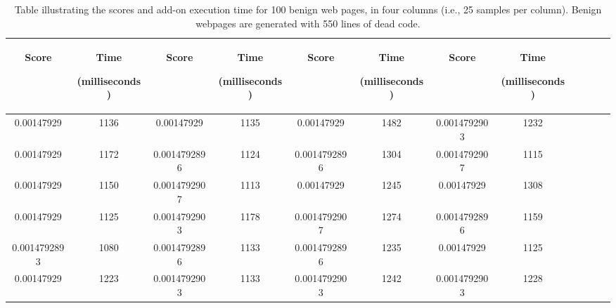   \begin {table}[h]
  \caption[Scores table of benign web pages]{Table illustrating the scores and add-on execution time for 100 benign web pages, in four columns (i.e., 25 samples per column). Benign webpages are generated with 550 lines of dead code.}
      \label{tab:b500table} 
  \begin{tabular}{|c|c|c|c|c|c|c|c|c|c|c|c|} 
  \midrule
 \begin{sideways}Score\end{sideways}& \begin{sideways}Time\end{sideways} \begin{sideways} (milliseconds)\end{sideways}& \begin{sideways}Score\end{sideways}& \begin{sideways}Time\end{sideways}  \begin{sideways}(milliseconds)\end{sideways}& \begin{sideways}Score\end{sideways}& \begin{sideways}Time\end{sideways}  \begin{sideways}(milliseconds)\end{sideways}& \begin{sideways}Score\end{sideways}& \begin{sideways}Time\end{sideways}  \begin{sideways} (milliseconds)\end{sideways}\\
\midrule
0.00147929&1136&0.00147929&1135&0.00147929&1482&0.0014792903&1232\\
\midrule
0.00147929&1172&0.0014792896&1124&0.0014792896&1304&0.0014792907&1115\\
\midrule
0.00147929&1150&0.0014792907&1113&0.00147929&1245&0.00147929&1308\\
\midrule
0.00147929&1125&0.0014792903&1178&0.0014792907&1274&0.0014792896&1159\\
\midrule
0.0014792893&1080&0.0014792896&1133&0.0014792896&1235&0.00147929&1125\\
\midrule
0.00147929&1223&0.0014792903&1133&0.0014792903&1242&0.0014792903&1228\\

\end{tabular}
\end{table}
